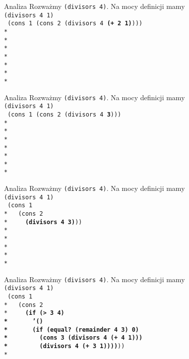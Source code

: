 \begin{frame}{Analiza}
  Rozważmy \texttt{(divisors 4)}. Na mocy definicji mamy\\
  \texttt{(divisors 4 1)}\\
  \texttt{
(cons 1 (cons 2 (divisors 4 \textbf{(+ 2 1)})))\\*
    \ \\*
    \ \\*
    \ \\*
    \ \\*
    \ \\*
    \ \\*
  }
\end{frame}

\begin{frame}{Analiza}
  Rozważmy \texttt{(divisors 4)}. Na mocy definicji mamy\\
  \texttt{(divisors 4 1)}\\
  \texttt{
(cons 1 (cons 2 (divisors 4 \textbf{3})))\\*
    \ \\*
    \ \\*
    \ \\*
    \ \\*
    \ \\*
    \ \\*
  }
\end{frame}

\begin{frame}{Analiza}
  Rozważmy \texttt{(divisors 4)}. Na mocy definicji mamy\\
  \texttt{(divisors 4 1)}\\
  \texttt{
(cons 1 \\*
\ \ (cons 2 \\*
\ \ \ \ \textbf{(divisors 4 3)}))\\*
    \ \\*
    \ \\*
    \ \\*
    \ \\*
  }
\end{frame}

\begin{frame}{Analiza}
  Rozważmy \texttt{(divisors 4)}. Na mocy definicji mamy\\
  \texttt{(divisors 4 1)}\\
  \texttt{
(cons 1 \\*
\ \ (cons 2 \\*
\ \ \ \ \textbf{(if (> 3 4)\\*
\ \ \ \ \ \ '()\\*
\ \ \ \ \ \ (if (equal?\ (remainder 4 3) 0)\\*
\ \ \ \ \ \ \ \ (cons 3 (divisors 4 (+ 4 1)))\\*
\ \ \ \ \ \ \ \ (divisors 4 (+ 3 1))))}))\\*
  }
\end{frame}

